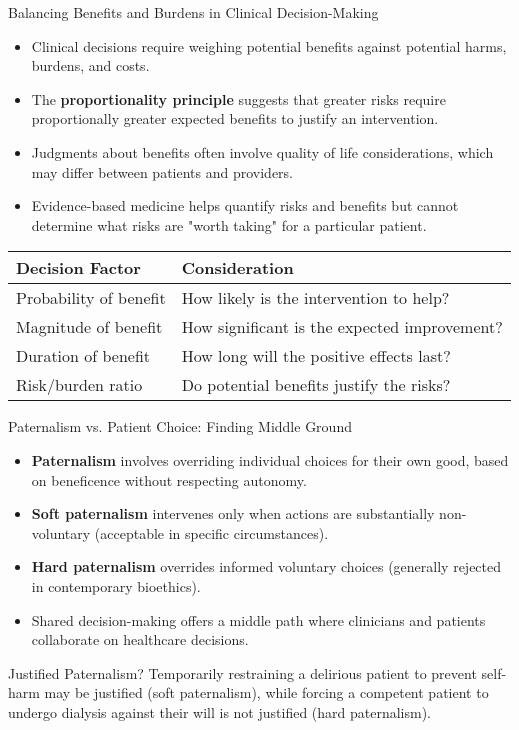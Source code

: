 \documentclass{beamer}
\begin{document}
	\begin{frame}{Balancing Benefits and Burdens in Clinical Decision-Making}
		\begin{itemize}
			\item Clinical decisions require weighing potential benefits against potential harms, burdens, and costs.
			\item The \textbf{proportionality principle} suggests that greater risks require proportionally greater expected benefits to justify an intervention.
			\item Judgments about benefits often involve quality of life considerations, which may differ between patients and providers.
			\item Evidence-based medicine helps quantify risks and benefits but cannot determine what risks are "worth taking" for a particular patient.
		\end{itemize}
		
		\begin{table}
			\begin{tabular}{l|l}
				\textbf{Decision Factor} & \textbf{Consideration} \\
				\hline
				Probability of benefit & How likely is the intervention to help? \\
				Magnitude of benefit & How significant is the expected improvement? \\
				Duration of benefit & How long will the positive effects last? \\
				Risk/burden ratio & Do potential benefits justify the risks? \\
			\end{tabular}
		\end{table}
	\end{frame}
	
	\begin{frame}{Paternalism vs. Patient Choice: Finding Middle Ground}
		\begin{itemize}
			\item \textbf{Paternalism} involves overriding individual choices for their own good, based on beneficence without respecting autonomy.
			\item \textbf{Soft paternalism} intervenes only when actions are substantially non-voluntary (acceptable in specific circumstances).
			\item \textbf{Hard paternalism} overrides informed voluntary choices (generally rejected in contemporary bioethics).
			\item Shared decision-making offers a middle path where clinicians and patients collaborate on healthcare decisions.
		\end{itemize}
		
		\begin{alertblock}{Justified Paternalism?}
			Temporarily restraining a delirious patient to prevent self-harm may be justified (soft paternalism), while forcing a competent patient to undergo dialysis against their will is not justified (hard paternalism).
		\end{alertblock}
	\end{frame}
	
\end{document}
